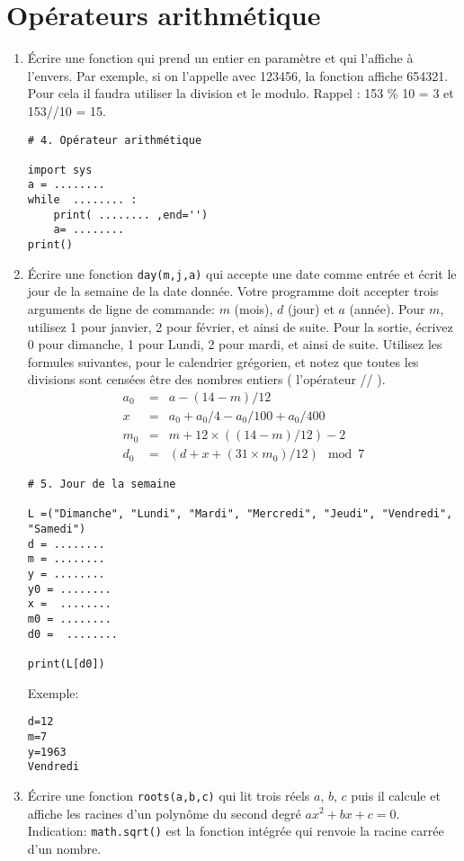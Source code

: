 \documentclass[a4paper]{article}
\begin{document}
\section{Opérateurs arithmétique}
\begin{enumerate}
\item Écrire une fonction qui prend un entier en paramètre et qui l'affiche à l'envers. Par exemple, si on l'appelle avec 123456, la fonction affiche 654321. Pour cela il faudra utiliser la division et le modulo. Rappel : 153 \% 10 = 3 et 153//10 = 15.

\begin{lstlisting}
# 4. Opérateur arithmétique

import sys
a = ........
while  ........ :
    print( ........ ,end='')
    a= ........
print()
\end{lstlisting}

\item Écrire une fonction {\tt day(m,j,a)} qui accepte une date comme entrée et écrit le jour de la semaine de la date donnée. Votre programme doit accepter trois arguments de ligne de commande: $m$ (mois), $d$ (jour) et $a$ (année). Pour $m$, utilisez 1 pour janvier, 2 pour février, et ainsi de suite. Pour la sortie, écrivez 0 pour dimanche, 1 pour
Lundi, 2 pour mardi, et ainsi de suite.
Utilisez les formules suivantes, pour le calendrier grégorien, et notez que toutes les divisions sont censées être des nombres entiers ( l'opérateur // ).
\[
\begin{array}{lcl}
a_0 &= &a - (14 - m)/12\\
x & = & a_0 + a_0/4 - a_0/100 + a_0/400\\
m_0 & = & m + 12 \times ( (14 - m) / 12) - 2\\
d_0 & = &  (d + x + (31\times m_0)/12) \mod 7
\end{array}
\]

\begin{lstlisting}
# 5. Jour de la semaine

L =("Dimanche", "Lundi", "Mardi", "Mercredi", "Jeudi", "Vendredi", "Samedi")
d = ........
m = ........
y = ........
y0 = ........
x =  ........
m0 = ........
d0 =  ........

print(L[d0])
\end{lstlisting}
Exemple:
\begin{verbatim}
d=12
m=7
y=1963
Vendredi
\end{verbatim}

\item Écrire une fonction {\tt roots(a,b,c)} qui lit trois réels $a$, $b$, $c$  puis il calcule et affiche les racines d'un polynôme du second degré  $ax^2 + bx + c = 0$.
Indication: {\tt math.sqrt()} est la fonction intégrée qui renvoie la racine carrée d'un nombre.


\end{enumerate}
\end{document}
